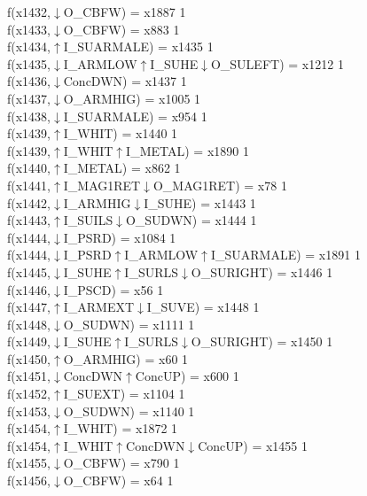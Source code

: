 f(x1432,$\downarrow$O\_CBFW) = x1887 {1} \\
f(x1433,$\downarrow$O\_CBFW) = x883 {1} \\
f(x1434,$\uparrow$I\_SUARMALE) = x1435 {1} \\
f(x1435,$\downarrow$I\_ARMLOW$\uparrow$I\_SUHE$\downarrow$O\_SULEFT) = x1212 {1} \\
f(x1436,$\downarrow$ConcDWN) = x1437 {1} \\
f(x1437,$\downarrow$O\_ARMHIG) = x1005 {1} \\
f(x1438,$\downarrow$I\_SUARMALE) = x954 {1} \\
f(x1439,$\uparrow$I\_WHIT) = x1440 {1} \\
f(x1439,$\uparrow$I\_WHIT$\uparrow$I\_METAL) = x1890 {1} \\
f(x1440,$\uparrow$I\_METAL) = x862 {1} \\
f(x1441,$\uparrow$I\_MAG1RET$\downarrow$O\_MAG1RET) = x78 {1} \\
f(x1442,$\downarrow$I\_ARMHIG$\downarrow$I\_SUHE) = x1443 {1} \\
f(x1443,$\uparrow$I\_SUILS$\downarrow$O\_SUDWN) = x1444 {1} \\
f(x1444,$\downarrow$I\_PSRD) = x1084 {1} \\
f(x1444,$\downarrow$I\_PSRD$\uparrow$I\_ARMLOW$\uparrow$I\_SUARMALE) = x1891 {1} \\
f(x1445,$\downarrow$I\_SUHE$\uparrow$I\_SURLS$\downarrow$O\_SURIGHT) = x1446 {1} \\
f(x1446,$\downarrow$I\_PSCD) = x56 {1} \\
f(x1447,$\uparrow$I\_ARMEXT$\downarrow$I\_SUVE) = x1448 {1} \\
f(x1448,$\downarrow$O\_SUDWN) = x1111 {1} \\
f(x1449,$\downarrow$I\_SUHE$\uparrow$I\_SURLS$\downarrow$O\_SURIGHT) = x1450 {1} \\
f(x1450,$\uparrow$O\_ARMHIG) = x60 {1} \\
f(x1451,$\downarrow$ConcDWN$\uparrow$ConcUP) = x600 {1} \\
f(x1452,$\uparrow$I\_SUEXT) = x1104 {1} \\
f(x1453,$\downarrow$O\_SUDWN) = x1140 {1} \\
f(x1454,$\uparrow$I\_WHIT) = x1872 {1} \\
f(x1454,$\uparrow$I\_WHIT$\uparrow$ConcDWN$\downarrow$ConcUP) = x1455 {1} \\
f(x1455,$\downarrow$O\_CBFW) = x790 {1} \\
f(x1456,$\downarrow$O\_CBFW) = x64 {1} \\
